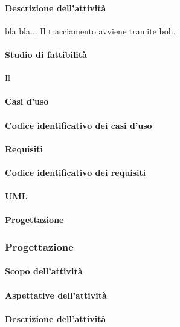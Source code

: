  \paragraph{Descrizione dell'attività}
 bla bla... \ARdocRR
 Il tracciamento avviene tramite boh.
 \paragraph{Studio di fattibilità}
 Il \RESP \SFdocRR
 \paragraph{Casi d'uso}

 \paragraph{Codice identificativo dei casi d'uso}

 \paragraph{Requisiti}

 \paragraph{Codice identificativo dei requisiti}

 \paragraph{UML}

 \paragraph{Progettazione}

\subsubsection{Progettazione}
 \paragraph{Scopo dell'attività}

 \paragraph{Aspettative dell'attività}

 \paragraph{Descrizione dell'attività}

